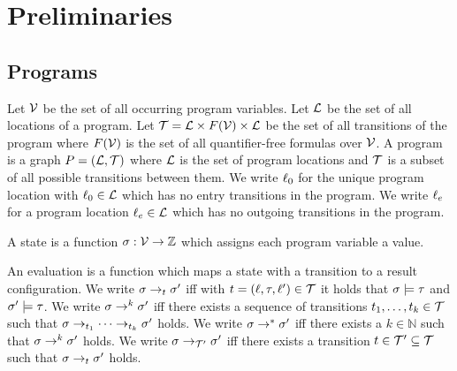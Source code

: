 \section{Preliminaries}


\subsection{Programs}

\begin{definition}[Program] 
	Let $\mathcal{V}$ be the set of all occurring program variables.
	Let $\mathcal{L}$ be the set of all locations of a program.
	Let $\mathcal{T} = \mathcal{L} \times F(\mathcal{V}) \times \mathcal{L}$ be the set of all transitions of the program where $F(\mathcal{V})$ is the set of all quantifier-free formulas over $\mathcal{V}$.
	A program is a graph $P = (\mathcal{L}, \mathcal{T})$ where $\mathcal{L}$ is the set of program locations and $\mathcal{T}$ is a subset of all possible transitions between them.
	We write $\ell_0$ for the unique program location with $\ell_0 \in \mathcal{L}$ which has no entry transitions in the program.
	We write $\ell_e$ for a program location $\ell_e \in \mathcal{L}$ which has no outgoing transitions in the program.
\end{definition}

\begin{definition}[State] 
	A state is a function $\sigma: \mathcal{V} \rightarrow \mathbb{Z}$ which assigns each program variable a value.
\end{definition}

\begin{definition}[Evaluation] 
	An evaluation is a function which maps a state with a transition to a result configuration.
	We write $\sigma \rightarrow_t \sigma'$ iff with $t = (\ell, \tau, \ell') \in \mathcal{T}$ it holds that $\sigma \models \tau$ and $\sigma' \models \tau$.
	We write $\sigma \rightarrow^k \sigma'$ iff there exists a sequence of transitions $t_1, \dots, t_k \in \mathcal{T}$ such that $\sigma \rightarrow_{t_1} \dots \rightarrow_{t_k} \sigma'$ holds.
	We write $\sigma \rightarrow^* \sigma'$ iff there exists a $k \in \mathbb{N}$ such that $\sigma \rightarrow^k \sigma'$ holds.
	We write $\sigma \rightarrow_{\mathcal{T}'} \sigma'$ iff there exists a transition $t \in \mathcal{T}' \subseteq \mathcal{T}$ such that $\sigma \rightarrow_t \sigma'$ holds.
\end{definition}


